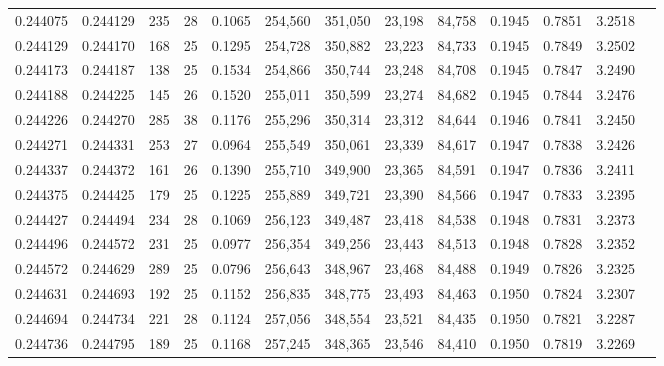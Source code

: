 \begin{tabular}{rrrrrrrrrrrrr}
0.244075 & 0.244129 &   235 &  28 &                                     0.1065 & 254,560 & 351,050 &  23,198 &  84,758 & 0.1945 & 0.7851 & 3.2518 \\
0.244129 & 0.244170 &   168 &  25 &                                     0.1295 & 254,728 & 350,882 &  23,223 &  84,733 & 0.1945 & 0.7849 & 3.2502 \\
0.244173 & 0.244187 &   138 &  25 &                                     0.1534 & 254,866 & 350,744 &  23,248 &  84,708 & 0.1945 & 0.7847 & 3.2490 \\
0.244188 & 0.244225 &   145 &  26 &                                     0.1520 & 255,011 & 350,599 &  23,274 &  84,682 & 0.1945 & 0.7844 & 3.2476 \\
0.244226 & 0.244270 &   285 &  38 &                                     0.1176 & 255,296 & 350,314 &  23,312 &  84,644 & 0.1946 & 0.7841 & 3.2450 \\
0.244271 & 0.244331 &   253 &  27 &                                     0.0964 & 255,549 & 350,061 &  23,339 &  84,617 & 0.1947 & 0.7838 & 3.2426 \\
0.244337 & 0.244372 &   161 &  26 &                                     0.1390 & 255,710 & 349,900 &  23,365 &  84,591 & 0.1947 & 0.7836 & 3.2411 \\
0.244375 & 0.244425 &   179 &  25 &                                     0.1225 & 255,889 & 349,721 &  23,390 &  84,566 & 0.1947 & 0.7833 & 3.2395 \\
0.244427 & 0.244494 &   234 &  28 &                                     0.1069 & 256,123 & 349,487 &  23,418 &  84,538 & 0.1948 & 0.7831 & 3.2373 \\
0.244496 & 0.244572 &   231 &  25 &                                     0.0977 & 256,354 & 349,256 &  23,443 &  84,513 & 0.1948 & 0.7828 & 3.2352 \\
0.244572 & 0.244629 &   289 &  25 &                                     0.0796 & 256,643 & 348,967 &  23,468 &  84,488 & 0.1949 & 0.7826 & 3.2325 \\
0.244631 & 0.244693 &   192 &  25 &                                     0.1152 & 256,835 & 348,775 &  23,493 &  84,463 & 0.1950 & 0.7824 & 3.2307 \\
0.244694 & 0.244734 &   221 &  28 &                                     0.1124 & 257,056 & 348,554 &  23,521 &  84,435 & 0.1950 & 0.7821 & 3.2287 \\
0.244736 & 0.244795 &   189 &  25 &                                     0.1168 & 257,245 & 348,365 &  23,546 &  84,410 & 0.1950 & 0.7819 & 3.2269 \\

\end{tabular}
